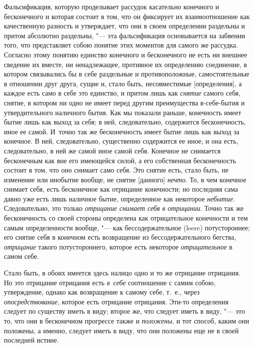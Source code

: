 Фальсификация, которую проделывает рассудок касательно конечного и
бесконечного и которая состоит в том, что он фиксирует их взаимоотношение
как качественную разность и утверждает, что они в своем определении
раздельны и притом абсолютно раздельны, "--- эта фальсификация основывается на
забвении того, что представляет собою понятие этих моментов для самого же
рассудка. Согласно этому понятию единство конечного и бесконечного не есть
ни внешнее сведение их вместе, ни ненадлежащее, противное их определению
соединение, в котором связывались бы в себе раздельные и противоположные,
самостоятельные в отношении друг друга, сущие и, стало быть, несовместимые
[определения], а каждое есть само в себе это единство, и притом лишь как
{\em снятие} самого себя, снятие, в котором ни одно не
имеет перед другим преимущества в-себе-бытия и утвердительного наличного
бытия. Как мы показали раньше, конечность имеет бытие лишь как выход за
себя; в ней, следовательно, содержится бесконечность, иное ее самой.
И~точно так же бесконечность имеет бытие лишь как выход за конечное. В ней,
следовательно, существенно содержится ее иное, и она есть, следовательно,
в ней же самой иное самой себя. Конечное не снимается бесконечным как вне
его имеющейся силой, а его собственная бесконечность состоит в том, что оно
снимает само себя. Это снятие есть, стало быть, не изменение или инобытие
вообще, не снятие [данного] {\em нечто}. То, в чем
конечное снимает себя, есть бесконечное как отрицание конечности; но
последняя сама давно уже есть лишь наличное бытие, определенное как
некоторое {\em небытие}. Следовательно, это только
{\em отрицание снимает себя в отрицании}. Точно так же
бесконечность со своей стороны определена как отрицательное конечности и
тем самым определенности вообще, "--- как бессодержательное (leere)
потустороннее; его снятие себя в конечном есть возвращение из
бессодержательного бегства, {\em отрицание} такого
потустороннего, которое есть некоторое
{\em отрицательное} в самом себе.

Стало быть, в обоих имеется здесь налицо одно и то же отрицание отрицания.
Но это отрицание отрицания есть {\em в~себе}
соотношение с самим собою, утверждение, однако как возвращение к самому
себе, т.~е., через {\em опосредствование}, которое есть
отрицание отрицания. Эти-то определения следует по существу иметь в виду;
второе же, что следует иметь в виду, "--- это то, что они в бесконечном
прогрессе также и {\em положены}, и тот способ, каким
они положены, а именно, следует иметь в виду, что они положены еще не в
своей последней истине.

